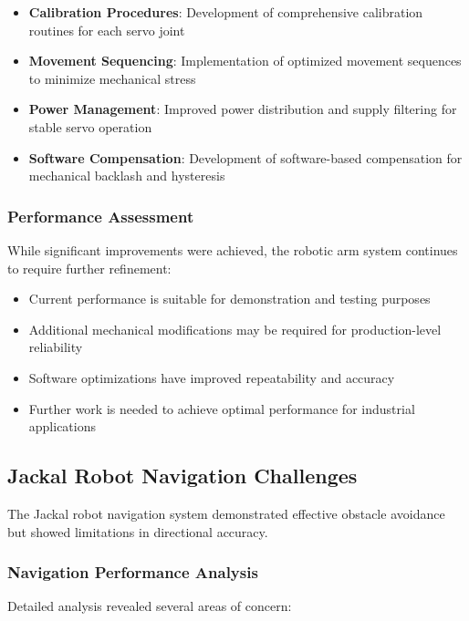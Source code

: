 \documentclass{book}
\begin{document}
\begin{itemize}
\item \textbf{Calibration Procedures}: Development of comprehensive calibration routines for each servo joint
\item \textbf{Movement Sequencing}: Implementation of optimized movement sequences to minimize mechanical stress
\item \textbf{Power Management}: Improved power distribution and supply filtering for stable servo operation
\item \textbf{Software Compensation}: Development of software-based compensation for mechanical backlash and hysteresis
\end{itemize}

\subsubsection{Performance Assessment}
\par\noindent While significant improvements were achieved, the robotic arm system continues to require further refinement:

\begin{itemize}
\item Current performance is suitable for demonstration and testing purposes
\item Additional mechanical modifications may be required for production-level reliability
\item Software optimizations have improved repeatability and accuracy
\item Further work is needed to achieve optimal performance for industrial applications
\end{itemize}

\subsection{Jackal Robot Navigation Challenges}

\par\noindent The Jackal robot navigation system demonstrated effective obstacle avoidance but showed limitations in directional accuracy.

\subsubsection{Navigation Performance Analysis}
\par\noindent Detailed analysis revealed several areas of concern:
\end{document}
